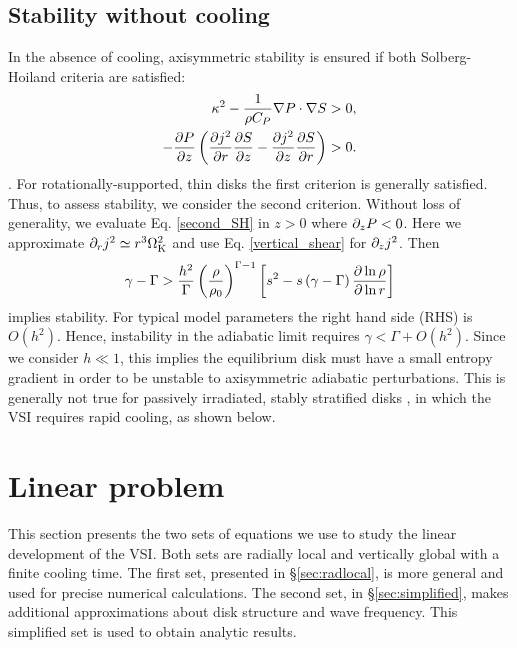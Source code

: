 \subsection{Stability without cooling}\label{solberg}
In the absence of cooling, axisymmetric stability is ensured
if both Solberg-Hoiland criteria  are satisfied:
\begin{align}
  \kappa^2 - \frac{1}{\rho C_P}\nabla P \cdot \nabla S &> 0,\\
  -\frac{\partial P}{\partial z}\left(\frac{\partial j^2}{\partial r}\frac{\partial S}{ \partial z} -
    \frac{\partial j^2}{\partial z}\frac{\partial S}{\partial r} \right)&>0. \label{second_SH} 
\end{align}
\citep{tassoul78}. %
For rotationally-supported, thin disks %
the first criterion is generally satisfied. 
Thus, to assess stability, we consider the second
criterion. 
Without loss of generality, we evaluate Eq. \ref{second_SH} in $z>0$
where $\partial_zP<0$. Here we approximate $\partial_r j^2\simeq r^3\Omega_{\rm K}^2$ and
use Eq. \ref{vertical_shear} for $\partial_zj^2$. Then 
\begin{align}\label{solberg2}
  \gamma - \Gamma > \frac{ h^2}{\Gamma}
  \left(\frac{\rho}{\rho_0}\right)^{\Gamma-1} \left[s^2
    -s\left(\gamma-\Gamma\right)\frac{\partial\ln{\rho}}{\partial\ln{r}} \right]
\end{align} 
implies stability. For typical model parameters the right hand
side (RHS) is $O( h^2)$. Hence, instability in the adiabatic limit  
requires $\gamma < \Gamma + O( h^2)$. Since we consider
$ h\ll1$, this implies the equilibrium disk must have a small
entropy gradient in order to be unstable to axisymmetric adiabatic
perturbations. This is generally not true for passively irradiated, stably
stratified disks \citep{chiang97}, in which the VSI requires rapid
cooling, as shown below. 

\section{Linear problem}\label{linear} 
This section presents the two sets of equations we use to study the
linear development of the VSI.  Both sets are radially local and vertically global 
with a finite cooling time.
The first set, presented in \S\ref{sec:radlocal}, is more general and used 
for precise numerical calculations.  The second set, in \S\ref{sec:simplified}, makes
additional approximations  about disk structure and wave frequency.  This simplified
set is used to obtain analytic results.


